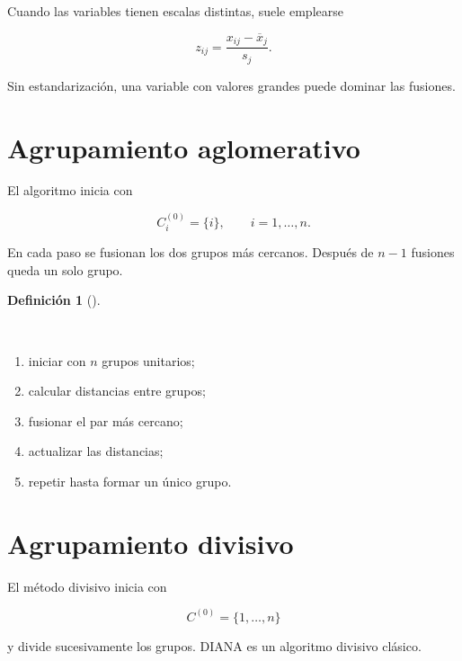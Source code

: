 \documentclass[
  spanish,
  10.5pt,
  letterpaper,
  DIV=11,
  numbers=noendperiod,
  oneside,
  open=any]{scrreprt}
\providecommand{\tightlist}{%
  \setlength{\itemsep}{0pt}\setlength{\parskip}{0pt}}
\theoremstyle{definition}
\newtheorem{definition}{Definición}[chapter]
\theoremstyle{definition}
\theoremstyle{plain}
\theoremstyle{remark}
\begin{document}

Cuando las variables tienen escalas distintas, suele emplearse

\[
z_{ij}
=
\frac{x_{ij}-\overline{x}_j}{s_j}.
\]

Sin estandarización, una variable con valores grandes puede dominar las
fusiones.

\section*{Agrupamiento aglomerativo}\label{agrupamiento-aglomerativo}


El algoritmo inicia con

\[
C_i^{(0)}=\{i\},
\qquad i=1,\ldots,n.
\]

En cada paso se fusionan los dos grupos más cercanos. Después de \(n-1\)
fusiones queda un solo grupo.

\begin{definition}[]\protect\hypertarget{def-algoritmo-aglomerativo}{}\label{def-algoritmo-aglomerativo}

~

\begin{enumerate}
\def\labelenumi{\arabic{enumi}.}
\tightlist
\item
  iniciar con \(n\) grupos unitarios;
\item
  calcular distancias entre grupos;
\item
  fusionar el par más cercano;
\item
  actualizar las distancias;
\item
  repetir hasta formar un único grupo.
\end{enumerate}

\end{definition}

\section*{Agrupamiento divisivo}\label{agrupamiento-divisivo}


El método divisivo inicia con

\[
C^{(0)}=\{1,\ldots,n\}
\]

y divide sucesivamente los grupos. DIANA es un algoritmo divisivo
clásico.
\end{document}
